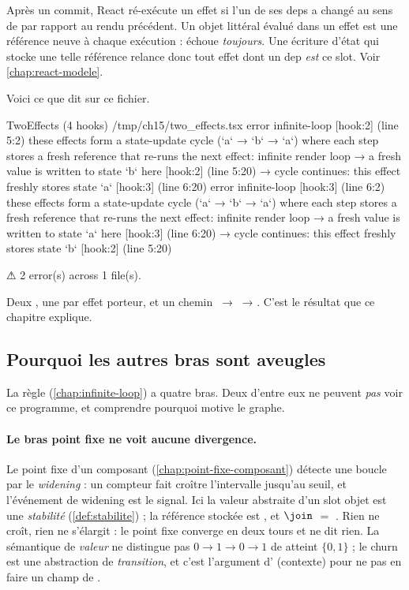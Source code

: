 \begin{react}
Après un commit, React ré-exécute un effet si l'un de ses deps a changé au sens de
 par rapport au rendu précédent. Un objet littéral  évalué dans
un effet est une référence neuve à chaque exécution :  échoue
\emph{toujours}. Une écriture d'état qui stocke une telle référence relance donc tout effet
dont un dep \emph{est} ce slot. Voir \cref{chap:react-modele}.
\end{react}

Voici ce que dit \reactant{} sur ce fichier.

\begin{sortie}
  TwoEffects  (4 hooks)  /tmp/ch15/two_effects.tsx
    error  infinite-loop  [hook:2]  (line 5:2)  these effects form a state-update cycle (`a` → `b` → `a`) where each step stores a fresh reference that re-runs the next effect: infinite render loop
       → a fresh value is written to state `b` here [hook:2] (line 5:20)
       → cycle continues: this effect freshly stores state `a` [hook:3] (line 6:20)
    error  infinite-loop  [hook:3]  (line 6:2)  these effects form a state-update cycle (`a` → `b` → `a`) where each step stores a fresh reference that re-runs the next effect: infinite render loop
       → a fresh value is written to state `a` here [hook:3] (line 6:20)
       → cycle continues: this effect freshly stores state `b` [hook:2] (line 5:20)

⚠  2 error(s) across 1 file(s).
\end{sortie}

Deux \Error, une par effet porteur, et un chemin ~→ ~→ . C'est le résultat
que ce chapitre explique.

\subsection{Pourquoi les autres bras sont aveugles}

La règle  (\cref{chap:infinite-loop}) a quatre bras. Deux d'entre
eux ne peuvent \emph{pas} voir ce programme, et comprendre pourquoi motive le graphe.

\paragraph{Le bras point fixe ne voit aucune divergence.} Le point fixe d'un composant
(\cref{chap:point-fixe-composant}) détecte une boucle par le \emph{widening} : un compteur
 fait croître l'intervalle jusqu'au seuil, et l'événement de widening
est le signal. Ici la valeur abstraite d'un slot objet est une \emph{stabilité}
(\cref{def:stabilite}) ; la référence stockée est , et
 $\join$  $=$ . Rien ne croît, rien ne
s'élargit : le point fixe converge en deux tours et ne dit rien. La sémantique de
\emph{valeur} ne distingue pas \og $0 \to 1 \to 0 \to 1$\fg{} de \og atteint
$\{0, 1\}$\fg{} ; le churn est une abstraction de \emph{transition}, et c'est l'argument
d' (contexte) pour ne pas en faire un champ de .

